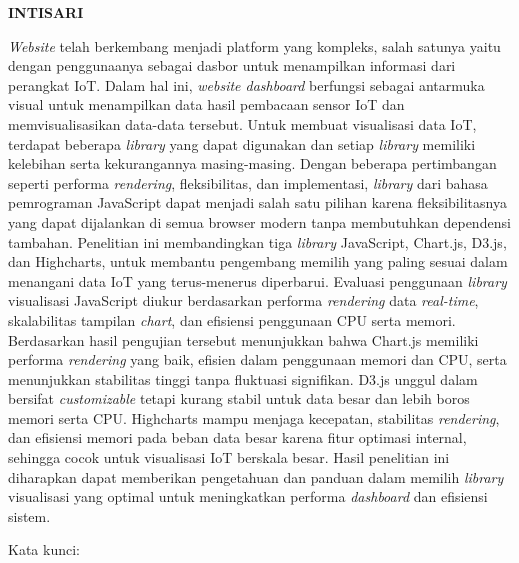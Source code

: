 \clearpage
{}
{}
\begin{center}
    \textbf{INTISARI}\\[0.5cm]
\end{center}

\textit{Website} telah berkembang menjadi platform yang kompleks, salah satunya yaitu dengan penggunaanya sebagai dasbor untuk menampilkan informasi dari perangkat IoT. Dalam hal ini, \textit{website dashboard} berfungsi sebagai antarmuka visual untuk menampilkan data hasil pembacaan sensor IoT dan memvisualisasikan data-data tersebut. Untuk membuat visualisasi data IoT, terdapat beberapa \textit{library} yang dapat digunakan dan setiap \textit{library} memiliki kelebihan serta kekurangannya masing-masing. Dengan beberapa pertimbangan seperti performa \textit{rendering}, fleksibilitas, dan implementasi, \textit{library} dari bahasa pemrograman JavaScript dapat menjadi salah satu pilihan karena fleksibilitasnya yang dapat dijalankan di semua browser modern tanpa membutuhkan dependensi tambahan. Penelitian ini membandingkan tiga \textit{library} JavaScript, Chart.js, D3.js, dan Highcharts, untuk membantu pengembang memilih yang paling sesuai dalam menangani data IoT yang terus-menerus diperbarui. Evaluasi penggunaan \textit{library} visualisasi JavaScript diukur berdasarkan performa \textit{rendering} data\textit{ real-time}, skalabilitas tampilan \textit{chart}, dan efisiensi penggunaan CPU serta memori. Berdasarkan hasil pengujian tersebut menunjukkan bahwa Chart.js memiliki performa \textit{rendering} yang baik, efisien dalam penggunaan memori dan CPU, serta menunjukkan stabilitas tinggi tanpa fluktuasi signifikan. D3.js unggul dalam bersifat \textit{customizable} tetapi kurang stabil untuk data besar dan lebih boros memori serta CPU. Highcharts mampu menjaga kecepatan, stabilitas \textit{rendering}, dan efisiensi memori pada beban data besar karena fitur optimasi internal, sehingga cocok untuk visualisasi IoT berskala besar. Hasil penelitian ini diharapkan dapat memberikan pengetahuan dan panduan dalam memilih \textit{library} visualisasi yang optimal untuk meningkatkan performa \textit{dashboard} dan efisiensi sistem. 

\noindent Kata kunci: \katakunci